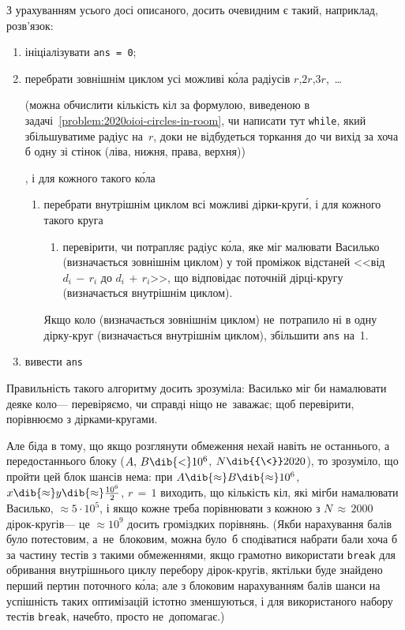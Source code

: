 З урахуванням усього досі описаного, досить очевидним є такий, наприклад, розв'язок: 
\begin{enumerate}
\item
ініціалізувати \texttt{ans = 0};
\item
перебрати зовнішнім циклом усі можливі к\'{о}ла радіусів $r$,\nolinebreak[2] $2r$,\nolinebreak[2] $3r$,~\dots{} \begin{footnotesize}{(можна обчислити кількість кіл за формулою, виведеною в задачі~\ref{problem:2020oioi-circles-in-room}, чи написати тут \texttt{while}, який збільшуватиме радіус на~$r$, доки не відбудеться торкання до чи вихід за хоча б одну зі стінок (ліва, нижня, права, верхня))}\end{footnotesize}, і для кожного такого к\'{о}ла
\begin{enumerate}
\item
перебрати внутрішнім циклом всі можливі дірки-круг\'{и}, і для кожного такого круга
\begin{enumerate}
\item
перевірити, чи потрапляє радіус к\'{о}ла, яке міг малювати Василько (визначається зовнішнім циклом) у той проміжок відстаней <<від\nolinebreak[2] ${d_i\,{-}\,r_i}$ до ${d_i\,{+}\,r_i}$>>, що відповідає поточній дірці-кругу (визначається внутрішнім циклом).
\end{enumerate}
Якщо коло (визначається зовнішнім циклом) не~потрапило ні в одну дірку-круг (визначається внутрішнім циклом), збільшити \texttt{ans} на~1.
\end{enumerate}
\item
вивести \texttt{ans}
\end{enumerate}

Правильність такого алгоритму досить зрозуміла: Василько міг би намалювати деяке коло\nolinebreak[3] --- перевіряємо, чи справді ніщо не~заважає; щоб перевірити, порівнюємо з дірками-кругами. 

Але біда в тому, що якщо розглянути обмеження нехай навіть не останнього, а передостаннього блоку (${A,\,B}\dib{{<}}10^6$, $N\dib{{\<}}2020$), то зрозуміло, що пройти цей блок шансів нема: при $A\dib{{\approx}}B\dib{{\approx}}10^6$, $x\dib{{\approx}}y\dib{{\approx}}\frac{10^6}{2}$, ${r\,{=}\,1}$ виходить, що кількість кіл, які міг\nolinebreak[3] би намалювати Василько, ${}\approx5\cdot10^5$, і якщо кожне треба порівнювати з кожною з ${N\,{\approx}\,2000}$ дірок-кругів\nolinebreak[3] --- це ${}\approx10^9$ досить громіздких порівнянь. (Якби нарахування балів було потестовим, а~не~блоковим, можна було~б сподіватися набрати бали хоча б за частину тестів з такими обмеженнями, якщо грамотно використати \texttt{break} для обривання внутрішнього циклу перебору дірок-кругів, як\nolinebreak[3] тільки буде знайдено перший пертин поточного к\'{о}ла; але з блоковим нарахуванням балів шанси на успішність таких оптимізацій істотно зменшуються, і для використаного набору тестів \texttt{break}, начебто, просто не~допомагає.)

